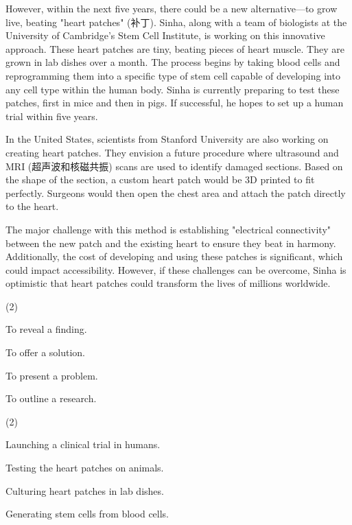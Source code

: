 \documentclass{英语试卷}
\begin{document}
\par However, within the next five years, there could be a new alternative—to grow live, beating "heart patches" (补丁). Sinha, along with a team of biologists at the University of Cambridge’s Stem Cell Institute, is working on this innovative approach. These heart patches are tiny, beating pieces of heart muscle. They are grown in lab dishes over a month. The process begins by taking blood cells and reprogramming them into a specific type of stem cell capable of developing into any cell type within the human body. Sinha is currently preparing to test these patches, first in mice and then in pigs. If successful, he hopes to set up a human trial within five years.\par
\par In the United States, scientists from Stanford University are also working on creating heart patches. They envision a future procedure where ultrasound and MRI (超声波和核磁共振) scans are used to identify damaged sections. Based on the shape of the section, a custom heart patch would be 3D printed to fit perfectly. Surgeons would then open the chest area and attach the patch directly to the heart.\par
\par The major challenge with this method is establishing "electrical connectivity" between the new patch and the existing heart to ensure they beat in harmony. Additionally, the cost of developing and using these patches is significant, which could impact accessibility. However, if these challenges can be overcome, Sinha is optimistic that heart patches could transform the lives of millions worldwide.\par
{}
\begin{choices}(2)
  \item To reveal a finding.
  \item To offer a solution.
  \item To present a problem.
  \item To outline a research.
\end{choices}
\begin{choices}(2)
  \item Launching a clinical trial in humans.
  \item Testing the heart patches on animals.
  \item Culturing heart patches in lab dishes.
  \item Generating stem cells from blood cells.
\end{choices}
\end{document}
